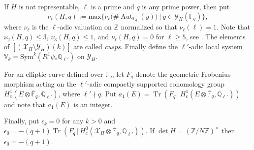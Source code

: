\documentclass[10pt]{article}
\theoremstyle{definition}
\DeclareMathOperator\Aut{Aut}
\DeclareMathOperator\Tr{Tr}
\renewcommand{\:}{\colon}
\newcommand{\V}{\mathbb{V}}
\newcommand{\F}{\mathbb{F}}
\begin{document}
If $H$ is not representable, $\ell$ is a prime and $q$ is any prime power, then put
\[
\nu_{\ell}(H,q):=\mathrm{max}\{\nu_{\ell}\bigl(\# \Aut_{\F_q}(y)\bigr) \ | \ y\in \mathcal Y_{H}(\F_q)\},
\]
where $\nu_{\ell}$ is the $\ell$-adic valuation on $\mathbb Z$ normalized so that $\nu_{\ell}(\ell)=1$. Note that $\nu_{2}(H,q) \leq 3$, $\nu_{3}(H,q) \leq 1$, and $\nu_{\ell}(H,q)=0$ for $\ell \geq 5$, see \cite[Theorem~10.1]{silverman}. The elements of $[(\mathcal X_{H} \setminus \mathcal Y_{H})(k)]$ are called \emph{cusps}. 
Finally define the $\ell'$-adic local system $\V_k=\mathrm{Sym}^k(R^1\psi_*\mathbb Q_{\ell'})$ on $ \mathcal Y_{H}$.

For an elliptic curve defined over $\F_q$, let $F_q$ denote the geometric Frobenius morphism acting on the $\ell'$-adic compactly supported cohomology group $H_c^1(E\otimes \overline{\F}_q,\mathbb Q_{\ell'})$, where $\ell' \nmid q$. Put $a_1(E)=\Tr(F_q \, | \,H_c^1(E\otimes \overline{\F}_q,\mathbb Q_{\ell'}))$ and note that $a_1(E)$ is an integer.

Finally, put
$\epsilon_k=0$ for any $k>0$ and $\epsilon_0=-(q+1) \Tr(F_q \, | \, H_c^0(\mathcal X_H\otimes \overline{\F}_q,\mathbb Q_{\ell'}))$.
If $\det H=(\mathbb Z/N\mathbb Z)^\times$ then $\epsilon_0=-(q+1)$.
\end{document}
